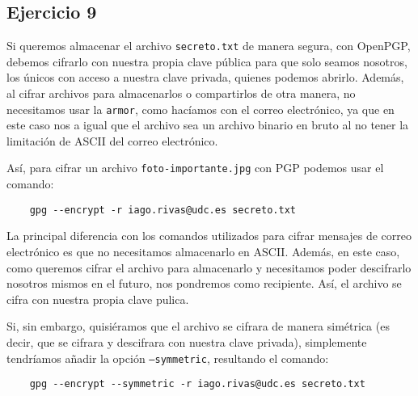 \subsection{Ejercicio 9}
\graphicspath{ {img/09} }

Si queremos almacenar el archivo \texttt{secreto.txt} de manera segura, con OpenPGP, debemos cifrarlo con nuestra propia clave pública para que solo seamos nosotros, los únicos con acceso a nuestra clave privada, quienes podemos abrirlo. Además, al cifrar archivos para almacenarlos o compartirlos de otra manera, no necesitamos usar la \texttt{armor}, como hacíamos con el correo electrónico, ya que en este caso nos a igual que el archivo sea un archivo binario en bruto al no tener la limitación de ASCII del correo electrónico.

Así, para cifrar un archivo \texttt{foto-importante.jpg} con PGP podemos usar el comando:

\begin{verbatim}
    gpg --encrypt -r iago.rivas@udc.es secreto.txt
\end{verbatim}

La principal diferencia con los comandos utilizados para cifrar mensajes de correo electrónico es que no necesitamos almacenarlo en ASCII. Además, en este caso, como queremos cifrar el archivo para almacenarlo y necesitamos poder descifrarlo nosotros mismos en el futuro, nos pondremos como recipiente. Así, el archivo se cifra con nuestra propia clave pulica.

Si, sin embargo, quisiéramos que el archivo se cifrara de manera simétrica (es decir, que se cifrara y descifrara con nuestra clave privada), simplemente tendríamos añadir la opción \texttt{--symmetric}, resultando el comando:

\begin{verbatim}
    gpg --encrypt --symmetric -r iago.rivas@udc.es secreto.txt
\end{verbatim}
